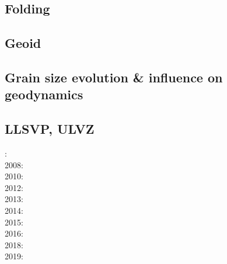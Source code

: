 \subsection*{Folding}

\noindent
\cite{ramb68}
\cite{ramb70}
\cite{ramb71}
\cite{flet91}
\cite{flet95}
\cite{frsc06}
\cite{schm08}
\cite{resb10}
\cite{freh11}
\cite{reds12}\cite{grsc12}
\cite{regc13}
\cite{freh14}\cite{frex14}
\cite{frsc16}


\subsection*{Geoid}

\cite{davi84}\cite{hage84}
\cite{davi86}
\cite{zhgu92}\cite{kiha92}
\cite{zhch93}\cite{rirl93}
\cite{king95}
\cite{mogu96}
\cite{cava98}
\cite{king09}
\cite{hibi12}
\cite{grab17}
\cite{king18}

\subsection*{Grain size evolution \& influence on geodynamics}

\cite{brcp99}
\cite{soet02}
\cite{hapa03}
\cite{rorb11}
\cite{besr14}
\cite{thrk15}
\cite{ceww17}\cite{daef17}\cite{mube17}
\cite{bemu18}\cite{bezb18}\cite{mube18}


\subsection*{LLSVP, ULVZ}

: \cite{heta07}\\
2008: \cite{gamc08}\\
2010: \cite{stto10}\\
2012: \cite{stto12}\cite{dagd12}\cite{dect12}\\
2013: \cite{limc13}\cite{bogs13a}\\
2014: \cite{budt14}\cite{lidt14}\\
2015: \cite{musd15}\cite{hafg15}\cite{mczh05a}\\
2016: \cite{dost16}\\
2018: \cite{daga18}\\
2019: \cite{hebo19}

